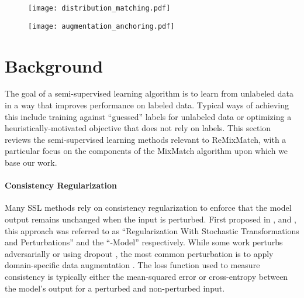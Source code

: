 \documentclass{article} \usepackage{iclr2020_conference,times}
\begin{document}
\begin{figure}[t]
\centering
\begin{minipage}{.485\textwidth}
  \centering
  \texttt{[image: distribution\_matching.pdf]}
  \label{fig:distribution_matching}
\end{minipage}\hfill
\begin{minipage}{.485\textwidth}
  \centering
  \vspace{-1em}
  \texttt{[image: augmentation\_anchoring.pdf]}
  \label{fig:augmentation_anchoring}
\end{minipage}
\end{figure}

\section{Background}

The goal of a semi-supervised learning algorithm is to learn from unlabeled data in a way that improves performance on labeled data.
Typical ways of achieving this include training against ``guessed'' labels for unlabeled data or optimizing a heuristically-motivated objective that does not rely on labels.
This section reviews the semi-supervised learning methods relevant to ReMixMatch, with a particular focus on the components of the MixMatch algorithm upon which we base our work.

\paragraph{Consistency Regularization}
Many SSL methods rely on consistency regularization to enforce that the model output remains unchanged when the input is perturbed.
First proposed in \citep{bachman2014learning}, \citep{sajjadi2016regularization} and \citep{laine2016temporal},
this approach was referred to as ``Regularization With Stochastic Transformations and Perturbations'' and the ``-Model'' respectively.
While some work perturbs adversarially \citep{miyato2018virtual} or using dropout \citep{laine2016temporal,tarvainen2017weight}, the most common perturbation is to apply domain-specific data augmentation \citep{laine2016temporal,sajjadi2016regularization,berthelot2019mixmatch,xie2019unsupervised}.
The loss function used to measure consistency is typically either the mean-squared error \citep{laine2016temporal,tarvainen2017weight,sajjadi2016regularization} or cross-entropy \citep{miyato2018virtual,xie2019unsupervised} between the model's output for a perturbed and non-perturbed input.
\end{document}
